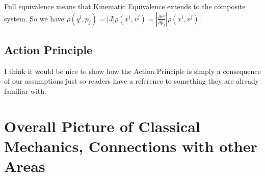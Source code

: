 \documentclass{article}
\begin{document}
\begin{defn}
	Full equivalence means that Kinematic Equivalence extends to the composite system. So we have $\rho(q^i,p_j) = \left|J\right|\rho(x^i,v^j) = \left|\frac{\partial v^i}{\partial p_j}\right|\rho(x^i,v^j)$. 
\end{defn}	

\subsection{Action Principle}

I think it would be nice to show how the Action Principle is simply a consequence of our assumptions just so readers have a reference to something they are already familiar with.

\section{Overall Picture of Classical Mechanics, Connections with other Areas} 
	
\end{document}
